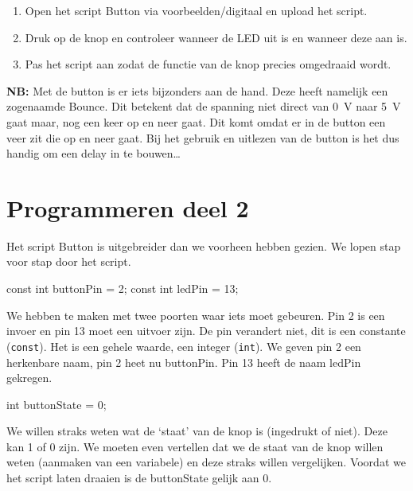 \documentclass{arduino}
\begin{document}
\begin{enumerate}[label={\alph*})]
\item Open het script Button via voorbeelden/digitaal en upload het script.

\item Druk op de knop en controleer wanneer de LED uit is en wanneer deze aan is.

\item Pas het script aan zodat de functie van de knop precies omgedraaid wordt.
\end{enumerate}


\textbf{NB:} Met de button is er iets bijzonders aan de hand. Deze heeft namelijk een zogenaamde Bounce. Dit betekent dat de spanning niet direct van \SI{0}{\volt} naar \SI{5}{\volt} gaat maar, nog een keer op en neer gaat. Dit komt omdat er in de button een veer zit die op en neer gaat. Bij het gebruik en uitlezen van de button is het dus handig om een delay in te bouwen\dots

\newpage

\section{Programmeren deel 2}

Het script Button is uitgebreider dan we voorheen hebben gezien. We lopen stap voor stap door het script.

\begin{marginlisting}
const int buttonPin = 2;
const int ledPin = 13;
\end{marginlisting}

We hebben te maken met twee poorten waar iets moet gebeuren. Pin 2 is een invoer en pin 13 moet een uitvoer zijn. De pin verandert niet, dit is een constante (\lstinline{const}). Het is een gehele waarde, een integer (\lstinline{int}). We geven pin 2 een herkenbare naam, pin 2 heet nu buttonPin. Pin 13 heeft de naam ledPin gekregen.

\begin{marginlisting}
int buttonState = 0;
\end{marginlisting}

We willen straks weten wat de ‘staat’ van de knop is (ingedrukt of niet). Deze kan 1 of 0 zijn. We moeten even vertellen dat we de staat van de knop willen weten (aanmaken van een variabele) en deze straks willen vergelijken. Voordat we het script laten draaien is de buttonState gelijk aan 0.
\end{document}
